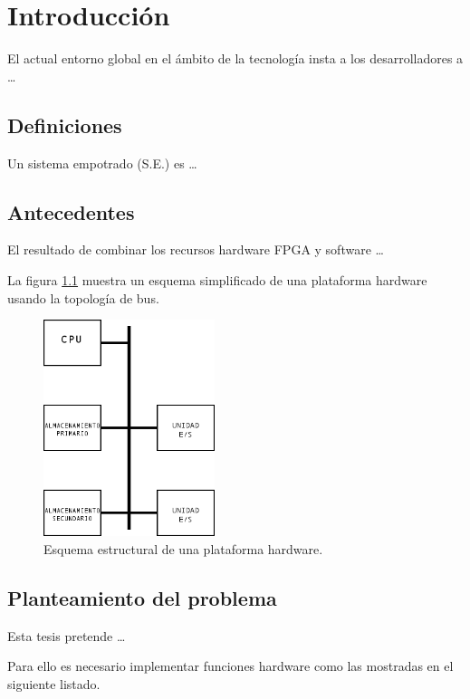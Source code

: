 \pagebreak  %
\cleardoublepage
\pagestyle{headings}

\chapter{Introducción}
%
El actual entorno global en el ámbito de la tecnología insta a los desarrolladores a \ldots

\section{Definiciones}
Un sistema empotrado (\textsf{S.E.}) es \ldots



\section{Antecedentes}
El resultado de combinar los recursos hardware FPGA y software \ldots

La figura \ref{fig_plat_hw} muestra un esquema simplificado de una plataforma hardware usando la topología de bus.

\begin{figure}[h]
  \centering
  \includegraphics[width=5cm]{fig/plataforma-hw.png} 
  \caption[Esquema estructural de una plataforma hardware.]%
  {Esquema estructural de una plataforma hardware.}
  \label{fig_plat_hw}
\end{figure}

\section{Planteamiento del problema}
Esta tesis pretende \ldots

Para ello es necesario implementar funciones hardware como las mostradas en el siguiente listado.

